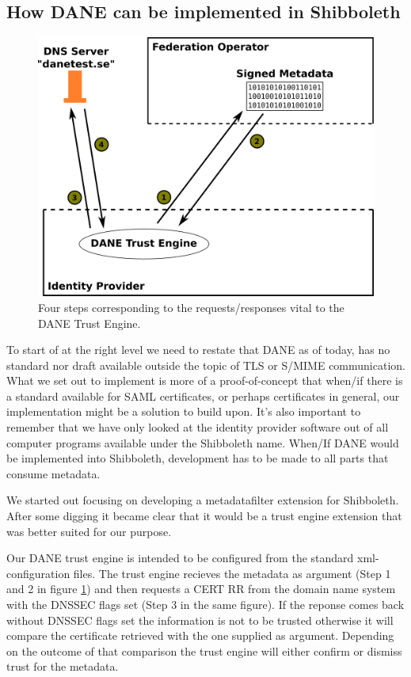 \subsection{How DANE can be implemented in Shibboleth}
\begin{figure}[ht]
\begin{center}
\includegraphics[scale=1]{Figures/dane-impl.png}
\end{center}
\caption{Four steps corresponding to the requests/responses vital to the DANE Trust Engine.
\label{ch5:dane-impl}}
\end{figure}


To start of at the right level we need to restate that DANE as of today, has no standard nor draft available outside the topic of TLS or S/MIME communication.
What we set out to implement is more of a proof-of-concept that when/if there is a standard available for SAML certificates, or perhaps certificates in general, our implementation might be a solution to build upon.
It's also important to remember that we have only looked at the identity provider software out of all computer programs available under the Shibboleth name.
When/If DANE would be implemented into Shibboleth, development has to be made to all parts that consume metadata.

We started out focusing on developing a metadatafilter extension for Shibboleth.
After some digging it became clear that it would be a trust engine extension that was better suited for our purpose.

Our DANE trust engine is intended to be configured from the standard xml-configuration files. 
The trust engine recieves the metadata as argument (Step 1 and 2 in figure \ref{ch5:dane-impl}) and then requests a CERT RR from the domain name system with the DNSSEC flags set (Step 3 in the same figure). 
If the reponse comes back without DNSSEC flags set the information is not to be trusted otherwise it will compare the certificate retrieved with the one supplied as argument.
Depending on the outcome of that comparison the trust engine will either confirm or dismiss trust for the metadata.

